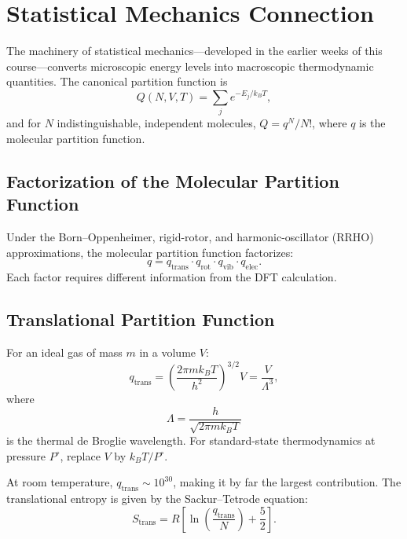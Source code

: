 \documentclass[11pt]{article}
\numberwithin{equation}{section}
\begin{document}
\section{Statistical Mechanics Connection}
\label{sec:statmech}

The machinery of statistical mechanics---developed in the earlier weeks of this course---converts microscopic energy levels into macroscopic thermodynamic quantities. The canonical partition function is
\begin{equation}
Q(N,V,T) = \sum_j e^{-E_j/k_BT},
\label{eq:partition}
\end{equation}
and for $N$ indistinguishable, independent molecules, $Q = q^N/N!$, where $q$ is the molecular partition function.

\subsection{Factorization of the Molecular Partition Function}

Under the Born--Oppenheimer, rigid-rotor, and harmonic-oscillator (RRHO) approximations, the molecular partition function factorizes:
\begin{equation}
\boxed{q = q_\text{trans}\cdot q_\text{rot}\cdot q_\text{vib}\cdot q_\text{elec}.}
\label{eq:q_factored}
\end{equation}
Each factor requires different information from the DFT calculation.

\subsection{Translational Partition Function}
\label{sec:qtrans}

For an ideal gas of mass $m$ in a volume $V$:
\begin{equation}
q_\text{trans} = \left(\frac{2\pi m k_BT}{h^2}\right)^{3/2}V = \frac{V}{\Lambda^3},
\label{eq:qtrans}
\end{equation}
where
\begin{equation}
\Lambda = \frac{h}{\sqrt{2\pi m k_BT}}
\label{eq:deBroglie}
\end{equation}
is the thermal de Broglie wavelength. For standard-state thermodynamics at pressure $P^\circ$, replace $V$ by $k_BT/P^\circ$.

At room temperature, $q_\text{trans} \sim 10^{30}$, making it by far the largest contribution. The translational entropy is given by the Sackur--Tetrode equation:
\begin{equation}
S_\text{trans} = R\left[\ln\!\left(\frac{q_\text{trans}}{N}\right) + \frac{5}{2}\right].
\label{eq:Sackur_Tetrode}
\end{equation}
\end{document}

